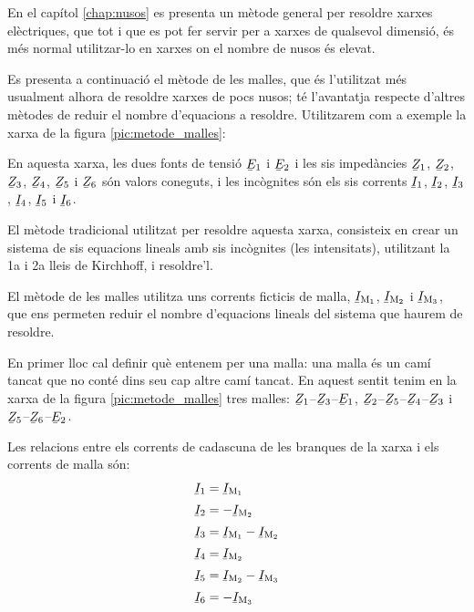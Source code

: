En el capítol \ref{chap:nusos} es presenta un mètode general per resoldre xarxes elèctriques, que tot i que es pot fer servir per a xarxes de qualsevol dimensió, és més normal utilitzar-lo en xarxes on el nombre de nusos és elevat.

Es presenta a continuació el mètode de les malles, que és l'utilitzat més usualment alhora de resoldre xarxes de pocs nusos; té l'avantatja respecte d'altres mètodes de reduir el nombre d'equacions a resoldre. Utilitzarem com a exemple la xarxa de la figura \vref{pic:metode_malles}:

\begin{center}
    
     \label{pic:metode_malles}
\end{center}

En aquesta xarxa, les dues fonts de tensió $\cmplx{E}_1$ i $\cmplx{E}_2$ i les sis impedàncies $\cmplx{Z}_1$, $\cmplx{Z}_2$, $\cmplx{Z}_3$, $\cmplx{Z}_4$, $\cmplx{Z}_5$ i $\cmplx{Z}_6$  són valors coneguts, i les incògnites són els sis corrents $\cmplx{I}_1$, $\cmplx{I}_2$, $\cmplx{I}_3$, $\cmplx{I}_4$, $\cmplx{I}_5$ i $\cmplx{I}_6$.

El mètode tradicional utilitzat per resoldre aquesta xarxa, consisteix en crear un sistema  de sis equacions lineals amb sis incògnites (les intensitats), utilitzant  la 1a i 2a lleis de Kirchhoff, i resoldre'l.

El mètode de les malles utilitza uns corrents ficticis de malla, $\cmplx{I}\ped{M_1}$, $\cmplx{I}\ped{M_2}$ i $\cmplx{I}\ped{M_3}$, que ens permeten reduir el nombre d'equacions lineals del  sistema que haurem de resoldre.



En primer lloc cal definir què entenem per una malla: una malla és un camí tancat que no conté dins seu cap altre camí tancat. En aquest sentit tenim en la xarxa de la figura \vref{pic:metode_malles} tres malles: $\cmplx{Z}_1$--$\cmplx{Z}_3$--$\cmplx{E}_1$, $\cmplx{Z}_2$--$\cmplx{Z}_5$--$\cmplx{Z}_4$--$\cmplx{Z}_3$ i $\cmplx{Z}_5$--$\cmplx{Z}_6$--$\cmplx{E}_2$.

Les relacions entre els corrents de cadascuna de les branques de la xarxa i els corrents de malla són:
\begin{subequations}
\begin{align}
    \cmplx{I}_1 &= \cmplx{I}\ped{M_1} \label{eq:malles1} \\[0.5ex]
    \cmplx{I}_2 &= -\cmplx{I}\ped{M_2} \\[0.5ex]
    \cmplx{I}_3 &= \cmplx{I}\ped{M_1}-\cmplx{I}\ped{M_2} \\[0.5ex]
    \cmplx{I}_4 &= \cmplx{I}\ped{M_2} \\[0.5ex]
    \cmplx{I}_5 &= \cmplx{I}\ped{M_2}-\cmplx{I}\ped{M_3} \\[0.5ex]
    \cmplx{I}_6 &= -\cmplx{I}\ped{M_3} \label{eq:malles2}
\end{align}
\end{subequations}

